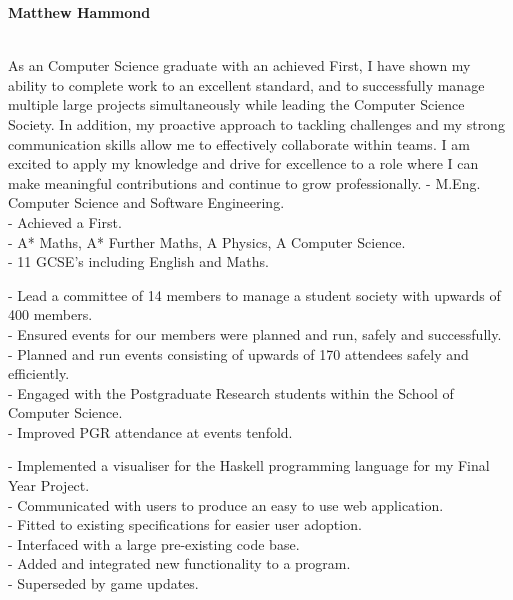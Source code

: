 \documentclass[twoside]{article}
\begin{document}
\selectfont
\begin{center}
    \noindent\huge\textbf{Matthew Hammond}
\end{center}\hr
{}
\hfill
{}\\
\hfill
{}\hr
As an Computer Science graduate with an achieved First, I have shown my ability to complete work to an excellent standard, and to successfully manage multiple large projects simultaneously while leading the Computer Science Society. In addition, my proactive approach to tackling challenges and my strong communication skills allow me to effectively collaborate within teams. I am excited to apply my knowledge and drive for excellence to a role where I can make meaningful contributions and continue to grow professionally.
- M.Eng. Computer Science and Software Engineering.\\
- Achieved a First.\vspace{2pt}\\
- A* Maths, A* Further Maths, A Physics, A Computer Science.\vspace{2pt}\\
- 11 GCSE's including English and Maths.

- Lead a committee of 14 members to manage a student society with upwards of 400 members.\\
- Ensured events for our members were planned and run, safely and successfully.\\
- Planned and run events consisting of upwards of 170 attendees safely and efficiently.\\
- Engaged with the Postgraduate Research students within the School of Computer Science.\\
- Improved PGR attendance at events tenfold.

- Implemented a visualiser for the Haskell programming language for my Final Year Project.\\
- Communicated with users to produce an easy to use web application.\\
- Fitted to existing specifications for easier user adoption.\\
- Interfaced with a large pre-existing code base.\\
- Added and integrated new functionality to a program.\\
- Superseded by game updates.
\end{document}
